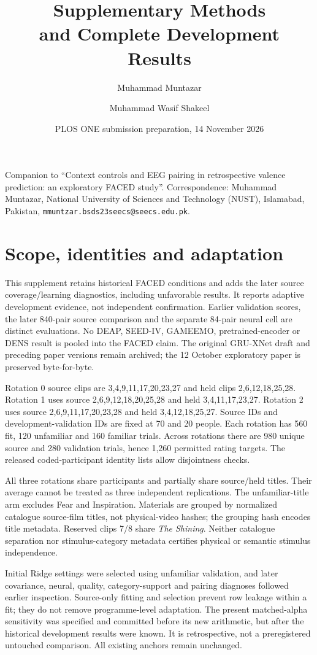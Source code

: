 \documentclass[10pt,a4paper]{article}
\title{Supplementary Methods\\and Complete Development Results}
\author{Muhammad Muntazar \and Muhammad Wasif Shakeel}
\date{PLOS ONE submission preparation, 14 November 2026}
\begin{document}
\maketitle
Companion to ``Context controls and EEG pairing in retrospective valence prediction: an exploratory FACED study''. Correspondence: Muhammad Muntazar, National University of Sciences and Technology (NUST), Islamabad, Pakistan, \nolinkurl{mmuntzar.bsds23seecs@seecs.edu.pk}.


\section{Scope, identities and adaptation}
This supplement retains historical FACED conditions and adds the later source coverage/learning diagnostics, including unfavorable results. It reports adaptive development evidence, not independent confirmation. Earlier validation scores, the later 840-pair source comparison and the separate 84-pair neural cell are distinct evaluations. No DEAP, SEED-IV, GAMEEMO, pretrained-encoder or DENS result is pooled into the FACED claim. The original GRU-XNet draft and preceding paper versions remain archived; the 12 October exploratory paper is preserved byte-for-byte.

Rotation 0 source clips are 3,4,9,11,17,20,23,27 and held clips 2,6,12,18,25,28. Rotation 1 uses source 2,6,9,12,18,20,25,28 and held 3,4,11,17,23,27. Rotation 2 uses source 2,6,9,11,17,20,23,28 and held 3,4,12,18,25,27. Source IDs and development-validation IDs are fixed at 70 and 20 people. Each rotation has 560 fit, 120 unfamiliar and 160 familiar trials. Across rotations there are 980 unique source and 280 validation trials, hence 1,260 permitted rating targets. The released coded-participant identity lists allow disjointness checks.

All three rotations share participants and partially share source/held titles. Their average cannot be treated as three independent replications. The unfamiliar-title arm excludes Fear and Inspiration. Materials are grouped by normalized catalogue source-film titles, not physical-video hashes; the grouping hash encodes title metadata. Reserved clips 7/8 share \emph{The Shining}. Neither catalogue separation nor stimulus-category metadata certifies physical or semantic stimulus independence.

Initial Ridge settings were selected using unfamiliar validation, and later covariance, neural, quality, category-support and pairing diagnoses followed earlier inspection. Source-only fitting and selection prevent row leakage within a fit; they do not remove programme-level adaptation. The present matched-alpha sensitivity was specified and committed before its new arithmetic, but after the historical development results were known. It is retrospective, not a preregistered untouched comparison. All existing anchors remain unchanged.
\end{document}
